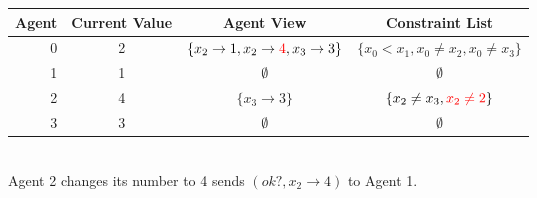 \documentclass[a4paper]{article}
\begin{document}
\begin{tabular}{r||c|c|c}
Agent   & Current Value     & Agent View    & Constraint List\\\hline
0       & 2 & $\{x_2 \to 1, x_2 \to \color{red}4\color{black}, x_3 \to 3\}$&$\{x_0 < x_1, x_0 \neq x_2, x_0 \neq x_3\}$\\
1       & 1                 & $\emptyset$ & $\emptyset$\\
2       & \color{red}4\color{black} & $\{x_3 \to 3\}$ & $\{x_2 \neq x_3, \color{red}x_2 \neq 2\color{black}\}$\\
3       & 3                 & $\emptyset$ & $\emptyset$\\
\end{tabular}\\
Agent 2 changes its number to 4 sends $(ok?, x_2 \to 4)$ to Agent 1.\\
\end{document}
